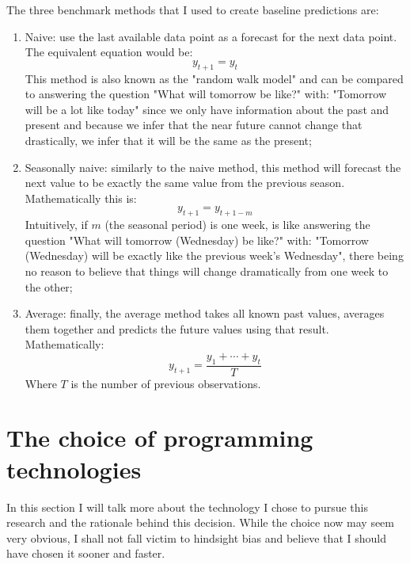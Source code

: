\documentclass[12pt,a4paper,titlepage]{report}
\begin{document}
The three benchmark methods \cite{fpp2simplemethods} that I used to create baseline predictions are:
\begin{enumerate}
    \item Naive: use the last available data point as a forecast for the next data point. The equivalent equation would be: \[ y_{t+1} = y_{t} \]
    This method is also known as the "random walk model" and can be compared to answering the question "What will tomorrow be like?" with: "Tomorrow will be a lot like today" since we only have information about the past and present and because we infer that the near future cannot change that drastically, we infer that it will be the same as the present;
    \item Seasonally naive: similarly to the naive method, this method will forecast the next value to be exactly the same value from the previous season. Mathematically this is: \[ y_{t+1} = y_{t+1-m} \] 
    Intuitively, if $ m $ (the seasonal period) is one week, is like answering the question "What will tomorrow (Wednesday) be like?" with: "Tomorrow (Wednesday) will be exactly like the previous week's Wednesday", there being no reason to believe that things will change dramatically from one week to the other;
    \item Average: finally, the average method takes all known past values, averages them together and predicts the future values using that result. Mathematically: \[ y_{t+1} = \frac{y_{1} + \cdots + y_{t}}{T} \]
    Where $ T $ is the number of previous observations.
\end{enumerate}

\section{The choice of programming technologies}

In this section I will talk more about the technology I chose to pursue this research and the rationale behind this decision.
While the choice now may seem very obvious, I shall not fall victim to hindsight bias \cite{hindsightbias} and believe that I should have chosen it sooner and faster.
\end{document}

